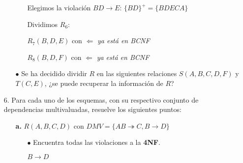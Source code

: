 \documentclass[12pt, letterpaper]{article}
\begin{document}
\begin{itemize}
\begin{itemize}
\begin{itemize}
                                                      Elegimos la violación $BD\rightarrow E$: $\{BD\}^+=\{BDECA\}$\vspace{.2cm}

                                                      Dividimos $R_{6}$:\vspace{.1cm}
                                                      
                                                      $R_{7}(B,D,E)$ con  \checkmark $\Leftarrow$ \textit{ya está en BCNF} \vspace{.1cm}

                                                      $R_{8}(B,D,F)$ con  \checkmark $\Leftarrow$ \textit{ya está en BCNF}\vspace{.3cm} 

                                            
                                        \end{itemize}

                    \item[$\bullet$]    Se ha decidido dividir $R$ en las 
                                        siguientes relaciones $S(A,B,C,D,F)$ y 
                                        $T(C,E)$, ¿se puede recuperar la información de $R$?   
                \end{itemize}

            
        \item[6.]   Para cada uno de los esquemas, con su respectivo conjunto 
                    de dependencias multivaluadas, resuelve los siguientes 
                    puntos:
                
                \begin{itemize}
                    \item[\textbf{a.}]  $R(A,B,C,D)$ con $DMV = \{AB \twoheadrightarrow C
                                        ,B \rightarrow D\}$
                     
                        \begin{itemize}

                            \item[$\bullet$]    Encuentra todas las violaciones 
                                                a la \textbf{4NF}. \vspace{.1cm}

                                                \begin{center}
                                                    $B \rightarrow D$
                                                \end{center}


\end{itemize}
\end{itemize}
\end{itemize}
\end{document}
